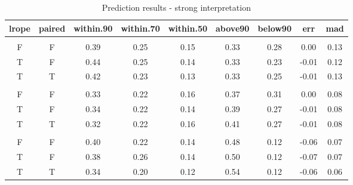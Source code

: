 \documentclass[twoside,11pt,preprint]{article}
\begin{document}
\begin{table}

\caption{\label{tab:predxz}\label{tab:preds}Prediction results - strong interpretation}
\centering
\begin{tabular}[t]{ccccccccc}
\toprule
\textbf{lrope} & \textbf{paired} & \textbf{within.90} & \textbf{within.70} & \textbf{within.50} & \textbf{above90} & \textbf{below90} & \textbf{err} & \textbf{mad}\\
\midrule
\addlinespace[0.3em]
\multicolumn{9}{l}{\textbf{ss}}\\
\hspace{1em}F & F & 0.39 & 0.25 & 0.15 & 0.33 & 0.28 & 0.00 & 0.13\\
\hspace{1em}T & F & 0.44 & 0.25 & 0.14 & 0.33 & 0.23 & -0.01 & 0.12\\
\hspace{1em}T & T & 0.42 & 0.23 & 0.13 & 0.33 & 0.25 & -0.01 & 0.13\\
\addlinespace[0.3em]
\multicolumn{9}{l}{\textbf{mm}}\\
\hspace{1em}F & F & 0.33 & 0.22 & 0.16 & 0.37 & 0.31 & 0.00 & 0.08\\
\hspace{1em}T & F & 0.34 & 0.22 & 0.14 & 0.39 & 0.27 & -0.01 & 0.08\\
\hspace{1em}T & T & 0.32 & 0.22 & 0.16 & 0.41 & 0.27 & -0.01 & 0.08\\
\addlinespace[0.3em]
\multicolumn{9}{l}{\textbf{sl}}\\
\hspace{1em}F & F & 0.40 & 0.22 & 0.14 & 0.48 & 0.12 & -0.06 & 0.07\\
\hspace{1em}T & F & 0.38 & 0.26 & 0.14 & 0.50 & 0.12 & -0.07 & 0.07\\
\hspace{1em}T & T & 0.34 & 0.20 & 0.12 & 0.54 & 0.12 & -0.06 & 0.06\\
\bottomrule
\end{tabular}
\end{table}
\end{document}
